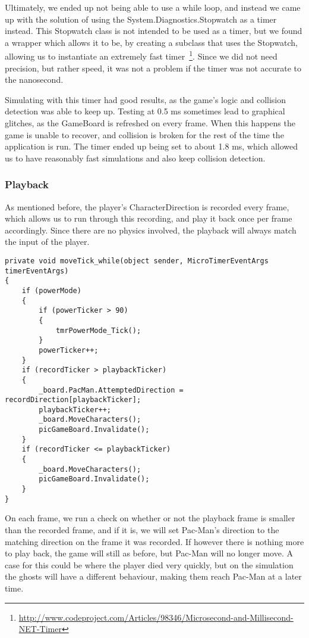 Ultimately, we ended up not being able to use a while loop, and instead we came up with the solution of using the System.Diagnostics.Stopwatch as a timer instead. This Stopwatch class is not intended to be used as a timer, but we found a wrapper which allows it to be, by creating a subclass that uses the Stopwatch, allowing us to instantiate an extremely fast timer~\footnote{\url{http://www.codeproject.com/Articles/98346/Microsecond-and-Millisecond-NET-Timer}}. Since we did not need precision, but rather speed, it was not a problem if the timer was not accurate to the nanosecond.

Simulating with this timer had good results, as the game’s logic and collision detection was able to keep up. Testing at 0.5 ms sometimes lead to graphical glitches, as the GameBoard is refreshed on every frame. When this happens the game is unable to recover, and collision is broken for the rest of the time the application is run. The timer ended up being set to about 1.8 ms, which allowed us to have reasonably fast simulations and also keep collision detection.

\subsubsection*{Playback}
As mentioned before, the player’s CharacterDirection is recorded every frame, which allows us to run through this recording, and play it back once per frame accordingly. Since there are no physics involved, the playback will always match the input of the player.

\begin{lstlisting}[caption=Snippet of frmScreen.cs. High resolution timer event method, label=lst:timer]
private void moveTick_while(object sender, MicroTimerEventArgs timerEventArgs)
{
	if (powerMode)
	{
		if (powerTicker > 90)
		{
			tmrPowerMode_Tick();
		}
		powerTicker++;
	}
	if (recordTicker > playbackTicker)
	{
		_board.PacMan.AttemptedDirection = recordDirection[playbackTicker];
		playbackTicker++;
		_board.MoveCharacters();
		picGameBoard.Invalidate();
	}
	if (recordTicker <= playbackTicker)
	{
		_board.MoveCharacters();
		picGameBoard.Invalidate();
	}
}
\end{lstlisting}

On each frame, we run a check on whether or not the playback frame is smaller than the recorded frame, and if it is, we will set Pac-Man’s direction to the matching direction on the frame it was recorded. If however there is nothing more to play back, the game will still as before, but Pac-Man will no longer move. A case for this could be where the player died very quickly, but on the simulation the ghosts will have a different behaviour, making them reach Pac-Man at a later time.

